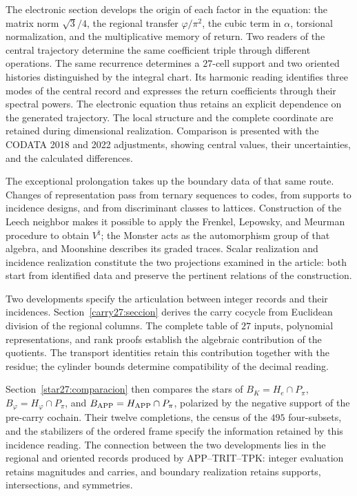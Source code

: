 The electronic section develops the origin of each factor in the equation:
the matrix norm \(\sqrt3/4\), the regional transfer
\(\varphi/\pi^2\), the cubic term in \(\alpha\), torsional
normalization, and the multiplicative memory of return. Two readers of the
central trajectory determine the same coefficient triple through
different operations. The same recurrence determines a \(27\)-cell support
and two oriented histories distinguished by the integral chart. Its harmonic
reading identifies three modes of the central record and expresses the
return coefficients through their spectral powers. The electronic equation
thus retains an explicit dependence on the generated trajectory.
The local structure and the complete coordinate are
retained during dimensional realization. Comparison is presented
with the CODATA 2018 and 2022 adjustments\cite{codata2018,codata2022}, showing
central values, their uncertainties, and the calculated differences.

The exceptional prolongation takes up the boundary data of that same
route. Changes of representation pass from ternary sequences to
codes, from supports to incidence designs, and from discriminant classes to
lattices. Construction of the Leech neighbor makes it possible to apply the
Frenkel, Lepowsky, and Meurman procedure to obtain \(V^\natural\);
the Monster acts as the automorphism group of that algebra, and Moonshine
describes its graded traces\cite{flm,borcherds}. Scalar realization
and incidence realization constitute the two projections examined
in the article: both start from identified data and preserve the
pertinent relations of the construction.

Two developments specify the articulation between integer records
and their incidences. Section~\ref{carry27:seccion} derives the carry
cocycle from Euclidean division of the regional columns. The complete
table of \(27\) inputs, polynomial representations, and rank proofs
establish the algebraic contribution of the quotients. The transport
identities retain this contribution together with the residue;
the cylinder bounds determine compatibility of the decimal reading.

Section~\ref{star27:comparacion} then compares the stars of
\(B_K=H_e\cap P_\pi\), \(B_\varphi=H_\varphi\cap P_\pi\), and
\(B_{\rm APP}=H_{\rm APP}\cap P_\pi\), polarized by the negative
support of the pre-carry cochain. Their twelve completions, the census
of the \(495\) four-subsets, and the stabilizers of the ordered frame
specify the information retained by this incidence reading.
The connection between the two developments lies in the regional
and oriented records produced by APP--TRIT--TPK: integer evaluation
retains magnitudes and carries, and boundary realization retains
supports, intersections, and symmetries.

